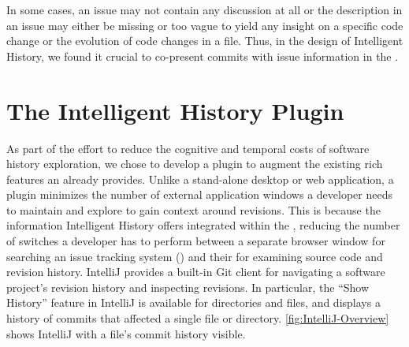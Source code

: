 In some cases, an issue may not contain any discussion at all or the description in an issue may either be missing 
or too vague to yield any insight on a specific code change or the evolution of code changes in a file.
Thus, in the design of Intelligent History, we found it crucial to co-present commits with issue information in the .

\section{The Intelligent History Plugin}
\label{sec:Implementation}

As part of the effort to reduce the cognitive and temporal costs of software history exploration, 
we chose to develop a plugin to augment the existing rich features an  already provides.
Unlike a stand-alone desktop or web application, a plugin minimizes the number of external application windows a developer needs to maintain and explore to gain context around revisions. 
This is because the information Intelligent History offers  integrated within the , 
reducing the number of switches a developer has to perform between a separate browser window for searching an issue tracking system ()
and their  for examining source code and revision history.
IntelliJ provides a built-in Git client  for navigating a software project's revision history and inspecting revisions. 
In particular, the ``Show History'' feature in IntelliJ is available for directories and files, 
and displays a history of commits that affected a single file or directory.
\autoref{fig:IntelliJ-Overview} shows IntelliJ with a file's commit history visible.

